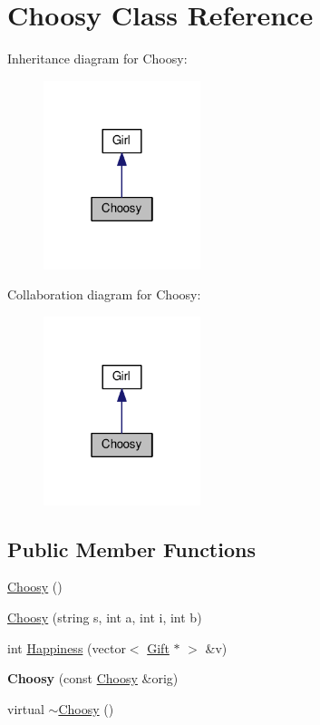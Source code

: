 \hypertarget{class_choosy}{\section{Choosy Class Reference}
\label{class_choosy}
}


Inheritance diagram for Choosy\-:
\nopagebreak
\begin{figure}[H]
\begin{center}
\leavevmode
\includegraphics[width=130pt]{class_choosy__inherit__graph}
\end{center}
\end{figure}


Collaboration diagram for Choosy\-:
\nopagebreak
\begin{figure}[H]
\begin{center}
\leavevmode
\includegraphics[width=130pt]{class_choosy__coll__graph}
\end{center}
\end{figure}
\subsection*{Public Member Functions}
\begin{DoxyCompactItemize}
\item 
\hyperlink{class_choosy_aa577b1cb5422337144420dc8ffce938f}{Choosy} ()
\item 
\hyperlink{class_choosy_ad6594b9b36ab46ab6b646cbcbc8b0a2c}{Choosy} (string s, int a, int i, int b)
\item 
int \hyperlink{class_choosy_a71e0e8b69c56aa1e8370583db4c538be}{Happiness} (vector$<$ \hyperlink{class_gift}{Gift} $\ast$ $>$ \&v)
\item 
\hypertarget{class_choosy_a3718d0828acf457a35021cd33eafc1a4}{{\bfseries Choosy} (const \hyperlink{class_choosy}{Choosy} \&orig)}\label{class_choosy_a3718d0828acf457a35021cd33eafc1a4}

\item 
virtual \hyperlink{class_choosy_ad2a79c4d8a661d1030c61f4f9985caa2}{$\sim$\-Choosy} ()
\end{DoxyCompactItemize}
